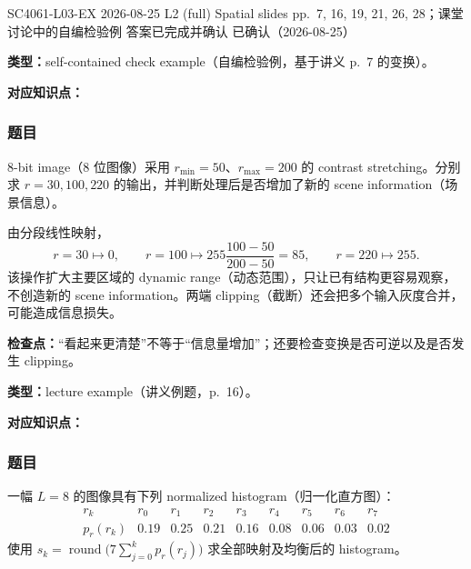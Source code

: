 

\examplemeta
  {SC4061-L03-EX}
  {2026-08-25}
  {L2 (full) Spatial slides pp.~7, 16, 19, 21, 26, 28；课堂讨论中的自编检验例}
  {答案已完成并确认}
  {已确认（2026-08-25）}


\textbf{类型：}self-contained check example（自编检验例，基于讲义 p.~7 的变换）。

\textbf{对应知识点：}

\subsubsection*{题目}

8-bit image（8 位图像）采用 $r_{\min}=50$、$r_{\max}=200$ 的 contrast stretching。分别求 $r=30,100,220$ 的输出，并判断处理后是否增加了新的 scene information（场景信息）。

\begin{checkedsolution}
由分段线性映射，
\[
  r=30\longmapsto\boxed{0},
  \qquad
  r=100\longmapsto
  255\frac{100-50}{200-50}=\boxed{85},
  \qquad
  r=220\longmapsto\boxed{255}.
\]
该操作扩大主要区域的 dynamic range（动态范围），只让已有结构更容易观察，不创造新的 scene information。两端 clipping（截断）还会把多个输入灰度合并，可能造成信息损失。
\end{checkedsolution}

\textbf{检查点：}``看起来更清楚''不等于``信息量增加''；还要检查变换是否可逆以及是否发生 clipping。


\textbf{类型：}lecture example（讲义例题，p.~16）。

\textbf{对应知识点：}

\subsubsection*{题目}

一幅 $L=8$ 的图像具有下列 normalized histogram（归一化直方图）：
\[
  \begin{array}{c|cccccccc}
    r_k & r_0&r_1&r_2&r_3&r_4&r_5&r_6&r_7\\ \hline
    p_r(r_k)&0.19&0.25&0.21&0.16&0.08&0.06&0.03&0.02
  \end{array}
\]
使用 $s_k=\operatorname{round}\bigl(7\sum_{j=0}^{k}p_r(r_j)\bigr)$ 求全部映射及均衡后的 histogram。


